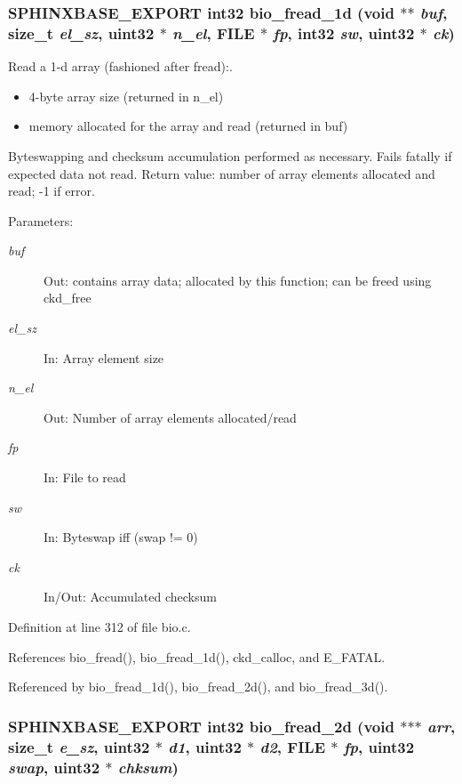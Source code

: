 \subsubsection[{bio\_\-fread\_\-1d}]{\setlength{\rightskip}{0pt plus 5cm}SPHINXBASE\_\-EXPORT int32 bio\_\-fread\_\-1d (void $\ast$$\ast$ {\em buf}, \/  size\_\-t {\em el\_\-sz}, \/  uint32 $\ast$ {\em n\_\-el}, \/  FILE $\ast$ {\em fp}, \/  int32 {\em sw}, \/  uint32 $\ast$ {\em ck})}\label{bio_8h_aeda1ca5a5c0ca5a9e5b4820c442bbe5}


Read a 1-d array (fashioned after fread):. 

\begin{itemize}
\item 4-byte array size (returned in n\_\-el)\item memory allocated for the array and read (returned in buf)\end{itemize}


Byteswapping and checksum accumulation performed as necessary. Fails fatally if expected data not read. Return value: number of array elements allocated and read; -1 if error. \begin{Desc}
\item[Parameters: ]\par
\begin{description}
\item[{\em 
buf}]Out: contains array data; allocated by this function; can be freed using ckd\_\-free \item[{\em 
el\_\-sz}]In: Array element size \item[{\em 
n\_\-el}]Out: Number of array elements allocated/read \item[{\em 
fp}]In: File to read \item[{\em 
sw}]In: Byteswap iff (swap != 0) \item[{\em 
ck}]In/Out: Accumulated checksum \end{description}
\end{Desc}


Definition at line 312 of file bio.c.

References bio\_\-fread(), bio\_\-fread\_\-1d(), ckd\_\-calloc, and E\_\-FATAL.

Referenced by bio\_\-fread\_\-1d(), bio\_\-fread\_\-2d(), and bio\_\-fread\_\-3d().
\subsubsection[{bio\_\-fread\_\-2d}]{\setlength{\rightskip}{0pt plus 5cm}SPHINXBASE\_\-EXPORT int32 bio\_\-fread\_\-2d (void $\ast$$\ast$$\ast$ {\em arr}, \/  size\_\-t {\em e\_\-sz}, \/  uint32 $\ast$ {\em d1}, \/  uint32 $\ast$ {\em d2}, \/  FILE $\ast$ {\em fp}, \/  uint32 {\em swap}, \/  uint32 $\ast$ {\em chksum})}\label{bio_8h_70604d0f8035f0868f9284fa82e4fdb8}


